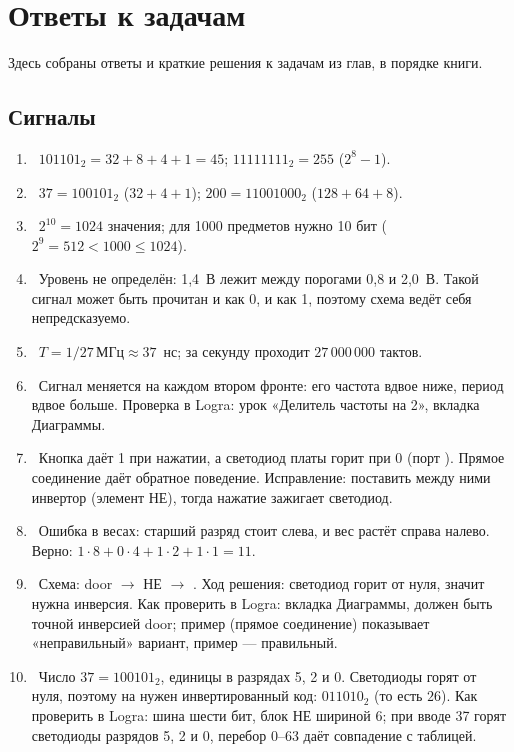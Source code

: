 \chapter{Ответы к задачам}
\label{app:answers}

Здесь собраны ответы и краткие решения к задачам из глав, в порядке книги.

\section*{Сигналы}
\begin{enumerate}
  \item {}~$101101_2=32+8+4+1=45$; $11111111_2=255$ ($2^8-1$).
  \item {}~$37=100101_2$ ($32+4+1$); $200=11001000_2$ ($128+64+8$).
  \item {}~$2^{10}=1024$ значения; для 1000 предметов нужно 10 бит ($2^9=512<1000\le 1024$).
  \item {}~Уровень не определён: 1,4~В лежит между порогами 0,8 и 2,0~В. Такой сигнал может быть прочитан и как 0, и как 1, поэтому схема ведёт себя непредсказуемо.
  \item {}~$T = 1/27\,\text{МГц}\approx 37$~нс; за секунду проходит $27\,000\,000$ тактов.
  \item {}~Сигнал меняется на каждом втором фронте: его частота вдвое ниже, период вдвое больше. Проверка в Logra: урок «Делитель частоты на 2», вкладка Диаграммы.
  \item {}~Кнопка даёт 1 при нажатии, а светодиод платы горит при 0 (порт ). Прямое соединение даёт обратное поведение. Исправление: поставить между ними инвертор (элемент НЕ), тогда нажатие зажигает светодиод.
  \item {}~Ошибка в весах: старший разряд стоит слева, и вес растёт справа налево. Верно: $1\cdot8+0\cdot4+1\cdot2+1\cdot1=11$.
  \item {}~Схема: door $\to$ НЕ $\to$ . Ход решения: светодиод горит от нуля, значит нужна инверсия. Как проверить в Logra: вкладка Диаграммы,  должен быть точной инверсией door; пример  (прямое соединение) показывает «неправильный» вариант, пример  --- правильный.
  \item {}~Число $37=100101_2$, единицы в разрядах 5, 2 и 0. Светодиоды горят от нуля, поэтому на  нужен инвертированный код: $011010_2$ (то есть $26$). Как проверить в Logra: шина шести бит, блок НЕ шириной 6; при вводе 37 горят светодиоды разрядов 5, 2 и 0, перебор 0--63 даёт совпадение с таблицей.
\end{enumerate}

